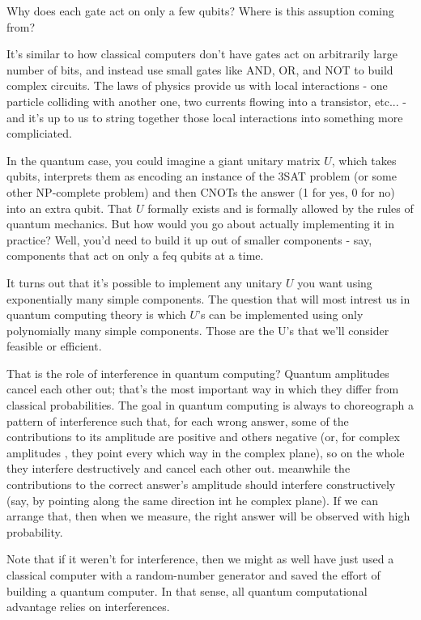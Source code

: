 Why does each gate act on only a few qubits? Where is this assuption coming from?

It's similar to how classical computers don't have gates act on arbitrarily large number of bits, and instead use small gates like AND, OR, and NOT to build complex circuits. The laws of physics provide us with local interactions - one particle colliding with another one, two currents flowing into a transistor, etc... - and it's up to us to string together those local interactions into something more compliciated.

In the quantum case, you could imagine a giant unitary matrix $U$, which takes qubits, interprets them as encoding an instance of the 3SAT problem (or some other NP-complete problem) and then CNOTs the answer (1 for yes, 0 for no) into an extra qubit. That $U$ formally exists and is formally allowed by the rules of quantum mechanics. But how would you go about actually implementing it in practice? Well, you'd need to build it up out of smaller components - say, components that act on only a feq qubits at a time.

It turns out that it's possible to implement any unitary $U$ you want using exponentially many simple components. The question that will most intrest us in quantum computing theory is which $U$'s can be implemented using only polynomially many simple components. Those are the U's that we'll consider feasible or efficient.

That is the role of interference in quantum computing? Quantum amplitudes cancel each other out; that's the most important way in which they differ from classical probabilities. The goal in quantum computing is always to choreograph a pattern of interference such that, for each wrong answer, some of the contributions to its amplitude are positive and others negative (or, for complex amplitudes , they point every which way in the complex plane), so on the whole they interfere destructively and cancel each other out. meanwhile the contributions to the correct answer's amplitude should interfere constructively (say, by pointing along the same direction int he complex plane). If we can arrange that, then when we measure, the right answer will be observed with high probability.

Note that if it weren't for interference, then we might as well have just used a classical computer with a random-number generator and saved the effort of building a quantum computer. In that sense, all quantum computational advantage relies on interferences.

